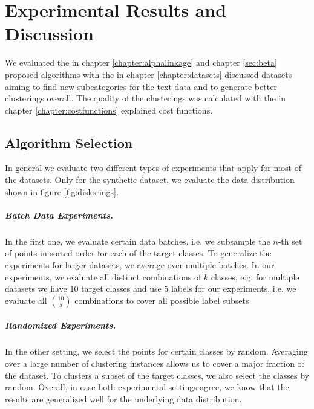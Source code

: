 \chapter{Experimental Results and Discussion}
\label{sec:results}

We evaluated the in chapter \ref{chapter:alphalinkage} and chapter \ref{sec:beta} proposed algorithms with the in chapter \ref{chapter:datasets} discussed datasets aiming to find new subcategories for the text data and to generate better clusterings overall. The quality of the clusterings was calculated with the in chapter \ref{chapter:costfunctions} explained cost functions.

\section{Algorithm Selection}

In general we evaluate two different types of experiments that apply for most of the datasets. Only for the synthetic dataset, we evaluate the data distribution shown in figure \ref{fig:disksrings}.

\paragraph{Batch Data Experiments.} In the first one, we evaluate certain data batches, i.e. we subsample the $n$-th set of points in sorted order for each of the target classes. To generalize the experiments for larger datasets, we average over multiple batches. In our experiments, we evaluate all distinct combinations of $k$ classes, e.g. for multiple datasets we have 10 target classes and use 5 labels for our experiments, i.e. we evaluate all $10 \choose 5$ combinations to cover all possible label subsets.

\paragraph{Randomized Experiments.} In the other setting, we select the points for certain classes by random. Averaging over a large number of clustering instances allows us to cover a major fraction of the dataset. To clusters a subset of the target classes, we also select the classes by random. Overall, in case both experimental settings agree, we know that the results are generalized well for the underlying data distribution.

